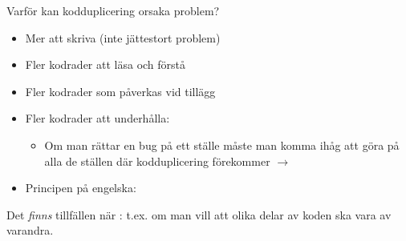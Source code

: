 \begin{Slide}{Varför kan kodduplicering orsaka problem?}
\pause
\begin{itemize}
\item Mer att skriva (inte jättestort problem)
\pause
\item Fler kodrader att läsa och förstå
\pause
\item Fler kodrader som påverkas vid tillägg
\pause

\item Fler kodrader att underhålla:
\begin{itemize}
\item Om man rättar en bug på ett ställe måste man komma ihåg att göra  på alla de ställen där kodduplicering förekommer $\rightarrow$ 
\end{itemize}

\pause

\item Principen på engelska: 

\pause

\end{itemize}
Det \emph{finns} tillfällen när  : \pause t.ex. om man vill att olika delar av koden ska vara  av varandra.
\end{Slide}




